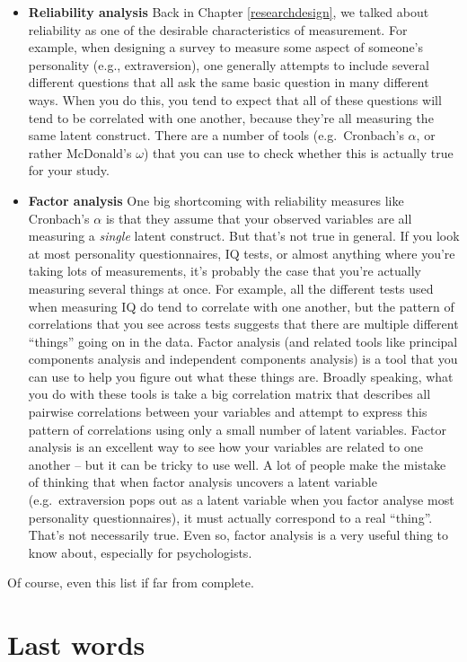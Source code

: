 \documentclass[
  11pt,
  a4paper,
  twoside,symmetric,openright]{book}
\theoremstyle{break}
\theoremstyle{break}
\begin{document}
\begin{itemize}
\item
  \textbf{Reliability analysis} Back in Chapter \ref{researchdesign}, we talked about reliability as one of the desirable characteristics of measurement. For example, when designing a survey to measure some aspect of someone's personality (e.g., extraversion), one generally attempts to include several different questions that all ask the same basic question in many different ways. When you do this, you tend to expect that all of these questions will tend to be correlated with one another, because they're all measuring the same latent construct. There are a number of tools (e.g.~Cronbach's \(\alpha\), or rather McDonald's \(\omega\)) that you can use to check whether this is actually true for your study.
\item
  \textbf{Factor analysis} One big shortcoming with reliability measures like Cronbach's \(\alpha\) is that they assume that your observed variables are all measuring a \emph{single} latent construct. But that's not true in general. If you look at most personality questionnaires, IQ tests, or almost anything where you're taking lots of measurements, it's probably the case that you're actually measuring several things at once. For example, all the different tests used when measuring IQ do tend to correlate with one another, but the pattern of correlations that you see across tests suggests that there are multiple different ``things'' going on in the data. Factor analysis (and related tools like principal components analysis and independent components analysis) is a tool that you can use to help you figure out what these things are. Broadly speaking, what you do with these tools is take a big correlation matrix that describes all pairwise correlations between your variables and attempt to express this pattern of correlations using only a small number of latent variables. Factor analysis is an excellent way to see how your variables are related to one another -- but it can be tricky to use well. A lot of people make the mistake of thinking that when factor analysis uncovers a latent variable (e.g.~extraversion pops out as a latent variable when you factor analyse most personality questionnaires), it must actually correspond to a real ``thing''. That's not necessarily true. Even so, factor analysis is a very useful thing to know about, especially for psychologists.
\end{itemize}

Of course, even this list if far from complete.

\section*{Last words}\label{last-words}
\end{document}
